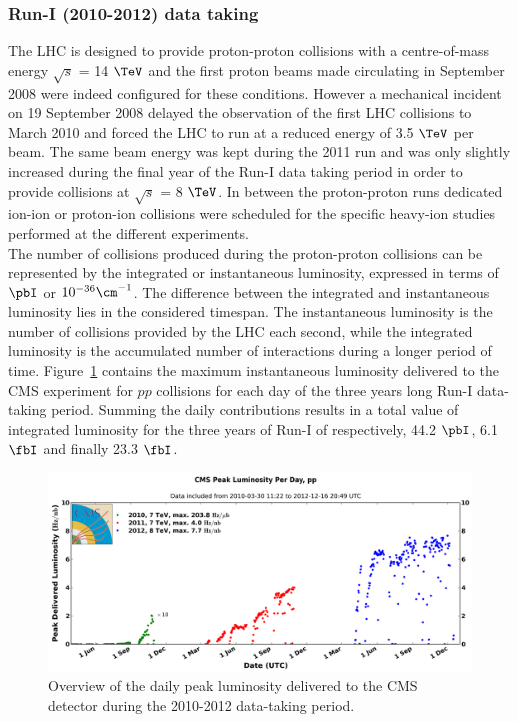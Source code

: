\subsubsection{Run-I (2010-2012) data taking}

The LHC is  designed to provide proton-proton collisions with a centre-of-mass energy $\sqrt{s}$ = 14 $\TeV$ and the first proton beams made circulating in September 2008 were indeed configured for these conditions. However a mechanical incident on 19 September 2008 delayed the observation of the first LHC collisions to March 2010 and forced the LHC to run at a reduced energy of 3.5 $\TeV$ per beam. The same beam energy was kept during the 2011 run and was only slightly increased during the final year of the Run-I data taking period in order to provide collisions at $\sqrt{s}$ = 8 $\TeV$. In between the proton-proton runs dedicated ion-ion or proton-ion collisions were scheduled for the specific heavy-ion studies performed at the different experiments.
\\
The number of collisions produced during the proton-proton collisions can be represented by the integrated or instantaneous luminosity, expressed in terms of $\pbI$ or $10^{-36} \cm^{-1}$. The difference between the integrated and instantaneous luminosity lies in the considered timespan. The instantaneous luminosity is the number of collisions provided by the LHC each second, while the integrated luminosity is the accumulated number of interactions during a longer period of time. Figure~\ref{fig::InstLumi} contains the maximum instantaneous luminosity delivered to the CMS experiment for $pp$ collisions for each day of the three years long Run-I data-taking period.
Summing the daily contributions results in a total value of integrated luminosity for the three years of Run-I of respectively, 44.2 $\pbI$, 6.1 $\fbI$ and finally 23.3 $\fbI$.
\begin{figure}[h!t]
 \centering
 \includegraphics[width = 0.95 \textwidth]{Chapters/Chapter2_CERN/Figures/InstanteneousLumi_FullRunI.png}
 \caption{Overview of the daily peak luminosity delivered to the CMS detector during the 2010-2012 data-taking period.} 
 \label{fig::InstLumi}
\end{figure}

